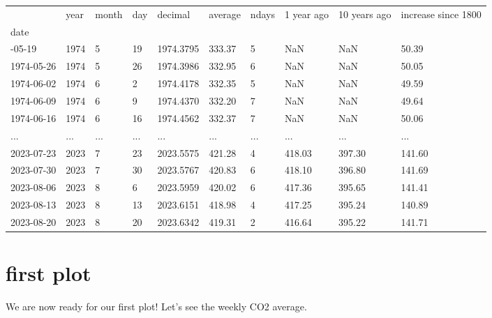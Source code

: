 \documentclass[
  letterpaper,
  DIV=11,
  numbers=noendperiod]{scrreprt}
\begin{document}
\begin{longtable}[]{@{}llllllllll@{}}
\toprule\noalign{}
& year & month & day & decimal & average & ndays & 1 year ago & 10 years
ago & increase since 1800 \\
date & & & & & & & & & \\
\midrule\noalign{}
\endhead
\bottomrule\noalign{}
\endlastfoot
1974-05-19 & 1974 & 5 & 19 & 1974.3795 & 333.37 & 5 & NaN & NaN &
50.39 \\
1974-05-26 & 1974 & 5 & 26 & 1974.3986 & 332.95 & 6 & NaN & NaN &
50.05 \\
1974-06-02 & 1974 & 6 & 2 & 1974.4178 & 332.35 & 5 & NaN & NaN &
49.59 \\
1974-06-09 & 1974 & 6 & 9 & 1974.4370 & 332.20 & 7 & NaN & NaN &
49.64 \\
1974-06-16 & 1974 & 6 & 16 & 1974.4562 & 332.37 & 7 & NaN & NaN &
50.06 \\
... & ... & ... & ... & ... & ... & ... & ... & ... & ... \\
2023-07-23 & 2023 & 7 & 23 & 2023.5575 & 421.28 & 4 & 418.03 & 397.30 &
141.60 \\
2023-07-30 & 2023 & 7 & 30 & 2023.5767 & 420.83 & 6 & 418.10 & 396.80 &
141.69 \\
2023-08-06 & 2023 & 8 & 6 & 2023.5959 & 420.02 & 6 & 417.36 & 395.65 &
141.41 \\
2023-08-13 & 2023 & 8 & 13 & 2023.6151 & 418.98 & 4 & 417.25 & 395.24 &
140.89 \\
2023-08-20 & 2023 & 8 & 20 & 2023.6342 & 419.31 & 2 & 416.64 & 395.22 &
141.71 \\
\end{longtable}

\section{first plot}\label{first-plot}

We are now ready for our first plot! Let's see the weekly CO2 average.
\end{document}
